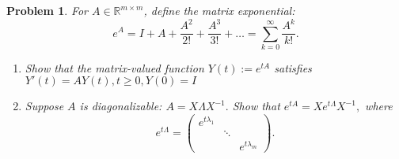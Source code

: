 \documentclass[12pt]{report}
\newtheorem{problem}{Problem}
\def\R{{\mathbb R}}
\begin{document}
\newpage



\begin{problem}
    For $A \in \R^{m \times m}$, define the matrix exponential:
    \[e^A = I + A + \frac{A^2}{2!} + \frac{A^3}{3!} + \ldots = \sum_{k=0}^{\infty}\frac{A^k}{k!}. \]
    \begin{enumerate}
        \item [(a)]
        Show that the matrix-valued function $Y(t) := e^{tA}$ satisfies $Y'(t) = AY(t), t \geq 0, Y(0) = I$ 
        
        \item [(b)]
        Suppose $A$ is diagonalizable: $A = X\Lambda X^{-1}.$ Show that $e^{tA} = X e^{t\Lambda}X^{-1},$ where
        \[ 
            e^{t\Lambda} = \begin{pmatrix}
                e^{t\lambda_1} & & \\
                & \ddots &\\
                & & e^{t\lambda_m}
            \end{pmatrix}.
        \] 
    
    \end{enumerate}
\end{problem}
\end{document}

